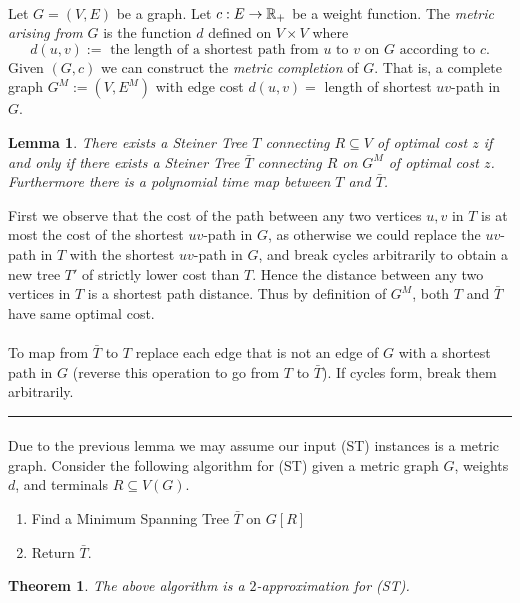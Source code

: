 \documentclass[letterpaper,12pt,oneside,onecolumn]{article}
\newenvironment{proof}{{\bf Proof:  }}{\hfill\rule{2mm}{2mm}}
\newtheorem{lemma}[fact]{Lemma}
\newtheorem{theorem}[fact]{Theorem}
\begin{document}
\paragraph{}
Let $G=(V,E)$ be a graph. Let $c : E \rightarrow \mathbb{R}_+$ be a weight function. The {\it metric arising from} $G$ is the function $d$ defined on $V \times V$ where
$$d(u,v) := \text{ the length of a shortest path from } u \text{ to } v \text{ on } G \text{ according to } c.$$ Given $(G,c)$ we can construct the {\it metric completion} of $G$. That is, a complete graph $G^M := (V, E^M)$ with edge cost $d(u,v)  = $ length of shortest $uv$-path in $G$.
\begin{lemma}
There exists a Steiner Tree $T$ connecting $R\subseteq V$ of optimal cost $z$ if and only if there exists a Steiner Tree $\bar{T}$ connecting $R$ on $G^M$ of optimal cost $z$. Furthermore there is a polynomial time map between $T$ and $\bar{T}$.
\end{lemma}
\begin{proof}
First we observe that the cost of the path between any two vertices $u,v$ in $T$ is at most the cost of the shortest $uv$-path in $G$, as otherwise we could replace the $uv$-path in $T$ with the shortest $uv$-path in $G$, and break cycles arbitrarily to obtain a new tree $T'$ of strictly lower cost than $T$. Hence the distance between any two vertices in $T$ is a shortest path distance. Thus by definition of $G^M$, both $T$ and $\bar{T}$ have same optimal cost.
\paragraph{}
To map from $\bar{T}$ to $T$ replace each edge that is not an edge of $G$ with a shortest path in $G$ (reverse this operation to go from $T$ to $\bar{T}$). If cycles form, break them arbitrarily.
\end{proof}
\paragraph{}
Due to the previous lemma we may assume our input (ST) instances is a metric graph. Consider the following algorithm for (ST) given a metric graph $G$, weights $d$, and terminals $R \subseteq V(G)$.
\begin{enumerate}
\item Find a Minimum Spanning Tree $\bar{T}$ on $G[R]$
\item Return $\bar{T}$.
\end{enumerate}
\begin{theorem}
The above algorithm is a $2$-approximation for (ST).
\end{theorem}
\end{document}
